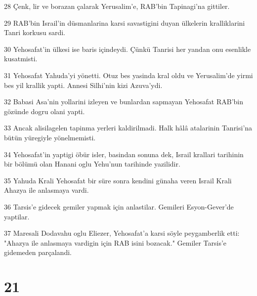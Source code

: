 \par 28 Çenk, lir ve borazan çalarak Yerusalim'e, RAB'bin Tapinagi'na gittiler.
\par 29 RAB'bin Israil'in düsmanlarina karsi savastigini duyan ülkelerin kralliklarini Tanri korkusu sardi.
\par 30 Yehosafat'in ülkesi ise baris içindeydi. Çünkü Tanrisi her yandan onu esenlikle kusatmisti.
\par 31 Yehosafat Yahuda'yi yönetti. Otuz bes yasinda kral oldu ve Yerusalim'de yirmi bes yil krallik yapti. Annesi Silhi'nin kizi Azuva'ydi.
\par 32 Babasi Asa'nin yollarini izleyen ve bunlardan sapmayan Yehosafat RAB'bin gözünde dogru olani yapti.
\par 33 Ancak alisilagelen tapinma yerleri kaldirilmadi. Halk hâlâ atalarinin Tanrisi'na bütün yüregiyle yönelmemisti.
\par 34 Yehosafat'in yaptigi öbür isler, basindan sonuna dek, Israil krallari tarihinin bir bölümü olan Hanani oglu Yehu'nun tarihinde yazilidir.
\par 35 Yahuda Krali Yehosafat bir süre sonra kendini günaha veren Israil Krali Ahazya ile anlasmaya vardi.
\par 36 Tarsis'e gidecek gemiler yapmak için anlastilar. Gemileri Esyon-Gever'de yaptilar.
\par 37 Maresali Dodavahu oglu Eliezer, Yehosafat'a karsi söyle peygamberlik etti: "Ahazya ile anlasmaya vardigin için RAB isini bozacak." Gemiler Tarsis'e gidemeden parçalandi.

\chapter{21}


